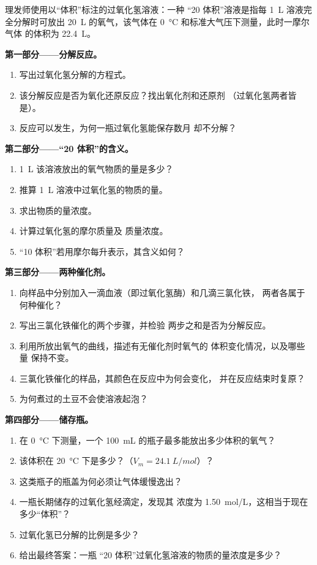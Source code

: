 \begin{problem}
\label{pb:g12:catalysis:1}
理发师使用以“体积”标注的过氧化氢溶液：一种
“20 体积”溶液是指每 \qty{1}{L} 溶液完全分解时可放出 \qty{20}{L}
的氧气，该气体在
\qty{0}{\celsius} 和标准大气压下测量，此时一摩尔气体
的体积为 \qty{22.4}{L}。

\medskip
\noindent\textbf{第一部分——分解反应。}
\begin{enumerate}
  \item 写出过氧化氢分解的方程式。
  \item 该分解反应是否为氧化还原反应？找出氧化剂和还原剂
        （过氧化氢两者皆是）。
  \item 反应可以发生，为何一瓶过氧化氢能保存数月
        却不分解？
\end{enumerate}

\medskip
\noindent\textbf{第二部分——“20 体积”的含义。}
\begin{enumerate}[resume]
  \item \qty{1}{L} 该溶液放出的氧气物质的量是多少？
  \item 推算 \qty{1}{L} 溶液中过氧化氢的物质的量。
  \item 求出物质的量浓度。
  \item 计算过氧化氢的摩尔质量及
        质量浓度。
  \item “10 体积”若用摩尔每升表示，其含义如何？
\end{enumerate}

\medskip
\noindent\textbf{第三部分——两种催化剂。}
\begin{enumerate}[resume]
  \item 向样品中分别加入一滴血液（即过氧化氢酶）和几滴三氯化铁，
        两者各属于何种催化？
  \item 写出三氯化铁催化的两个步骤，并检验
        两步之和是否为分解反应。
  \item 利用所放出氧气的曲线，描述有无催化剂时氧气的
        体积变化情况，以及哪些量
        保持不变。
  \item 三氯化铁催化的样品，其颜色在反应中为何会变化，
        并在反应结束时复原？
  \item 为何煮过的土豆不会使溶液起泡？
\end{enumerate}

\medskip
\noindent\textbf{第四部分——储存瓶。}
\begin{enumerate}[resume]
  \item 在 \qty{0}{\celsius} 下测量，一个
        \qty{100}{mL} 的瓶子最多能放出多少体积的氧气？
  \item 该体积在 \qty{20}{\celsius} 下是多少？（$V_m =
        \qty{24.1}{L/mol}$）？
  \item 这类瓶子的瓶盖为何必须让气体缓慢逸出？
  \item 一瓶长期储存的过氧化氢经滴定，发现其
        浓度为 \qty{1.50}{mol/L}，这相当于现在多少“体积”？
  \item 过氧化氢已分解的比例是多少？
  \item 给出最终答案：一瓶
        “20 体积”过氧化氢溶液的物质的量浓度是多少？
\end{enumerate}
\end{problem}
